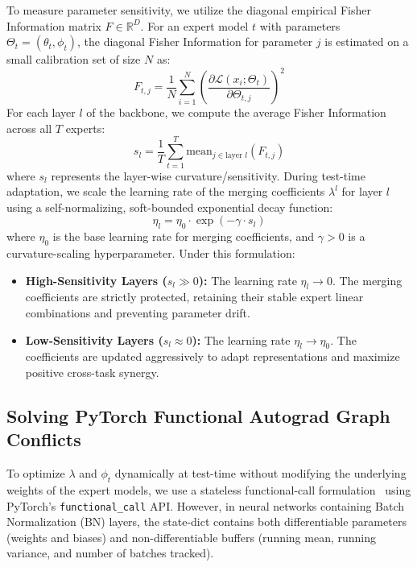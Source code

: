 \documentclass{article}
\begin{document}
To measure parameter sensitivity, we utilize the diagonal empirical Fisher Information matrix $F \in \mathbb{R}^D$. For an expert model $t$ with parameters $\Theta_t = (\theta_t, \phi_t)$, the diagonal Fisher Information for parameter $j$ is estimated on a small calibration set of size $N$ as:
\begin{equation}
    F_{t, j} = \frac{1}{N} \sum_{i=1}^N \left( \frac{\partial \mathcal{L}(x_i; \Theta_t)}{\partial \Theta_{t, j}} \right)^2
\end{equation}
For each layer $l$ of the backbone, we compute the average Fisher Information across all $T$ experts:
\begin{equation}
    s_l = \frac{1}{T} \sum_{t=1}^T \text{mean}_{j \in \text{layer } l} (F_{t, j})
\end{equation}
where $s_l$ represents the layer-wise curvature/sensitivity. During test-time adaptation, we scale the learning rate of the merging coefficients $\lambda^l$ for layer $l$ using a self-normalizing, soft-bounded exponential decay function:
\begin{equation}
    \eta_l = \eta_0 \cdot \exp(-\gamma \cdot s_l)
\end{equation}
where $\eta_0$ is the base learning rate for merging coefficients, and $\gamma > 0$ is a curvature-scaling hyperparameter. Under this formulation:
\begin{itemize}\itemsep=0pt\parsep=0pt\topsep=2pt
    \item \textbf{High-Sensitivity Layers ($s_l \gg 0$):} The learning rate $\eta_l \to 0$. The merging coefficients are strictly protected, retaining their stable expert linear combinations and preventing parameter drift.
    \item \textbf{Low-Sensitivity Layers ($s_l \approx 0$):} The learning rate $\eta_l \to \eta_0$. The coefficients are updated aggressively to adapt representations and maximize positive cross-task synergy.
\end{itemize}

\subsection{Solving PyTorch Functional Autograd Graph Conflicts}
To optimize $\lambda$ and $\phi_t$ dynamically at test-time without modifying the underlying weights of the expert models, we use a stateless functional-call formulation~\cite{song23} using PyTorch's \texttt{functional\_call} API. However, in neural networks containing Batch Normalization (BN) layers, the state-dict contains both differentiable parameters (weights and biases) and non-differentiable buffers (running mean, running variance, and number of batches tracked).
\end{document}

